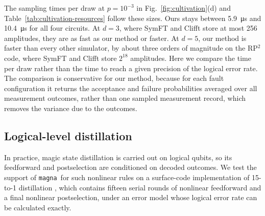 \documentclass[aps,prx,twocolumn,superscriptaddress,longbibliography]{revtex4-2}
\newcommand{\simname}{\texttt{magna}}
\begin{document}
The sampling times per draw at $p=10^{-3}$ in Fig.~\ref{fig:cultivation}(d) and Table~\ref{tab:cultivation-resources}
follow these sizes.
Ours stays between \qty{5.9}{\micro\second} and \qty{10.4}{\micro\second} for all four circuits.
At $d=3$, where SymFT and Clifft store at most 256 amplitudes, they are as fast as our method or faster.
At $d=5$, our method is faster than every other simulator,
by about three orders of magnitude on the RP$^2$ code, where SymFT and Clifft store $2^{18}$ amplitudes.
Here we compare the time per draw rather than the time to reach a given precision of the logical error rate.
The comparison is conservative for our method,
because for each fault configuration it returns the acceptance and failure probabilities
averaged over all measurement outcomes, rather than one sampled measurement record,
which removes the variance due to the outcomes.

      

\subsection{Logical-level distillation}\label{sec:logical-distillation}

In practice, magic state distillation is carried out on logical qubits,
so its feedforward and postselection are conditioned on decoded outcomes.
We test the support of \simname\ for such nonlinear rules
on a surface-code implementation of 15-to-1 distillation
\cite{fowlerSurfaceCodesPractical2012,litinskiGameSurfaceCodes2019},
which contains fifteen serial rounds of nonlinear feedforward and a final nonlinear postselection,
under an error model whose logical error rate can be calculated exactly.
\end{document}
